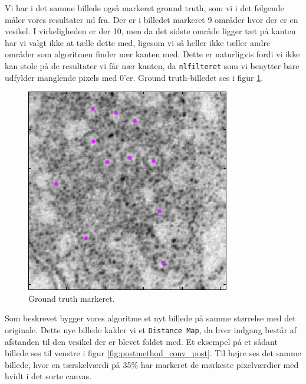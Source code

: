 Vi har i det samme billede også markeret ground truth, som vi i det følgende måler vores resultater ud fra. Der er i billedet markeret 9 områder hvor der er en vesikel. I virkeligheden er der 10, men da det sidste område ligger tæt på kanten har vi valgt ikke at tælle dette med, ligesom vi så heller ikke tæller andre områder som algoritmen finder nær kanten med. Dette er naturligvis fordi vi ikke kan stole på de resultater vi får nær kanten, da \texttt{nlfilteret} som vi benytter bare udfylder manglende pixels med 0'er. Ground truth-billedet ses i figur \ref{fig:postmethod_conv_gt}. 

\begin{figure}[H]
		\centering
		\includegraphics[scale=0.65]{files/postmethod/img/ground_truth.png}
	\caption{Ground truth markeret.\label{fig:postmethod_conv_gt}}
\end{figure}

Som beskrevet bygger vores algoritme et nyt billede på samme størrelse med det originale. Dette nye billede kalder vi et \texttt{Distance Map}, da hver indgang består af afstanden til den vesikel der er blevet foldet med. Et eksempel på et sådant billede ses til venstre i figur \ref{fig:postmethod_conv_post}. Til højre ses det samme billede, hvor en tærskelværdi på 35\% har markeret de mørkeste pixelværdier med hvidt i det sorte canvas.

